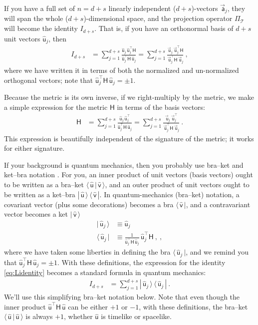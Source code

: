 \documentclass{article}
\newcommand{\metric}{\mathsf{H}}
\newcommand{\proj}{\mathsf{\Pi}}
\newcommand\upvec[1]{\!\vec{\,\mathrm{#1}}}
\newcommand{\Lvec}[1]{\upvec{\mathsf{#1}}} %
\newcommand{\Lhat}[1]{\hat{\mathsf{#1}}} %
\newcommand{\bra}[1]{\langle\,{#1}\,|}
\newcommand{\ket}[1]{|\,{#1}\,\rangle}
\newcommand{\braket}[2]{\langle\,{#1}\,|\,{#2}\,\rangle}
\newcommand{\ketbra}[2]{|\,{#1}\,\rangle\,\langle\,{#2}\,|}
\newcommand{\plus}{\!+\!} %
\begin{document}
If you have a full set of $n=d+s$ linearly independent ($d\plus s$)-vectors $\Lvec{a}_j$, they will span the whole ($d\plus s$)-dimensional space, and the projection operator $\proj_\mathscr{T}$ will become the identity $I_{d+s}$.
That is, if you have an orthonormal basis of $d+s$ unit vectors $\Lhat{u}_j$, then
\begin{align}
    I_{d+s} &= \sum_{j=1}^{d+s} \frac{\Lhat{u}_j\,\Lhat{u}_j^\top\metric}{\Lhat{u}_j^\top\metric\,\Lhat{u}_j} = \sum_{j=1}^{d+s} \frac{\Lvec{u}_j\,\Lvec{u}_j^\top\metric}{\Lvec{u}_j^\top\metric\,\Lvec{u}_j} \label{eq:Lidentity} ~,
\end{align}
where we have written it in terms of both the normalized and un-normalized orthogonal vectors; note that $\Lhat{u}_j^\top\metric\,\Lhat{u}_j=\pm 1$.

Because the metric is its own inverse, if we right-multiply by the metric, we make a simple expression for the metric $\metric$ in terms of the basis vectors:
\begin{align}
    \metric &= \sum_{j=1}^{d+s} \frac{\Lhat{u}_j\,\Lhat{u}_j^\top}{\Lhat{u}_j^\top\metric\,\Lhat{u}_j} = \sum_{j=1}^{d+s} \frac{\Lvec{u}_j\,\Lvec{u}_j^\top}{\Lvec{u}_j^\top\metric\,\Lvec{u}_j} ~.
\end{align}
This expression is beautifully independent of the signature of the metric; it works for either signature.

If your background is quantum mechanics, then you probably use bra--ket and ket--bra notation \cite{dirac}.
For you, an inner product of unit vectors (basis vectors) ought to be written as a bra--ket $\braket{\Lhat{u}}{\Lhat{v}}$, and an outer product of unit vectors ought to be written as a ket--bra $\ketbra{\Lhat{u}}{\Lhat{v}}$.
In quantum-mechanics (bra--ket) notation, a covariant vector (plus some decorations) becomes a bra $\bra{\Lhat{v}}$, and a contravariant vector becomes a ket $\ket{\Lhat{v}}$
\begin{align}
    \ket{\Lhat{u}_j} &\equiv \Lhat{u}_j \label{eq:ket}\\
    \bra{\Lhat{u}_j} &\equiv \frac{1}{\Lhat{u}_j^\top\metric\,\Lhat{u}_j}\,\Lhat{u}_j^\top\metric ~,\label{eq:bra} ~,
\end{align}
where we have taken some liberties in defining the bra $\bra{\Lhat{u}_j}$, and we remind you that $\Lhat{u}_j^\top\metric\,\Lhat{u}_j=\pm 1$.
With these definitions, the expression for the identity \eqref{eq:Lidentity} becomes a standard formula in quantum mechanics:
\begin{align}
    I_{d+s} &= \sum_{j=1}^{d+s} \ketbra{\Lhat{u}_j}{\Lhat{u}_j} \label{eq:LidentityQM} ~.
\end{align}
We'll use this simplifying bra--ket notation below.
Note that even though the inner product $\Lhat{u}^\top\metric\,\Lhat{u}$ can be either $+1$ or $-1$, with these definitions, the bra--ket $\braket{\Lhat{u}}{\Lhat{u}}$ is always $+1$, whether $\Lhat{u}$ is timelike or spacelike.
\end{document}
